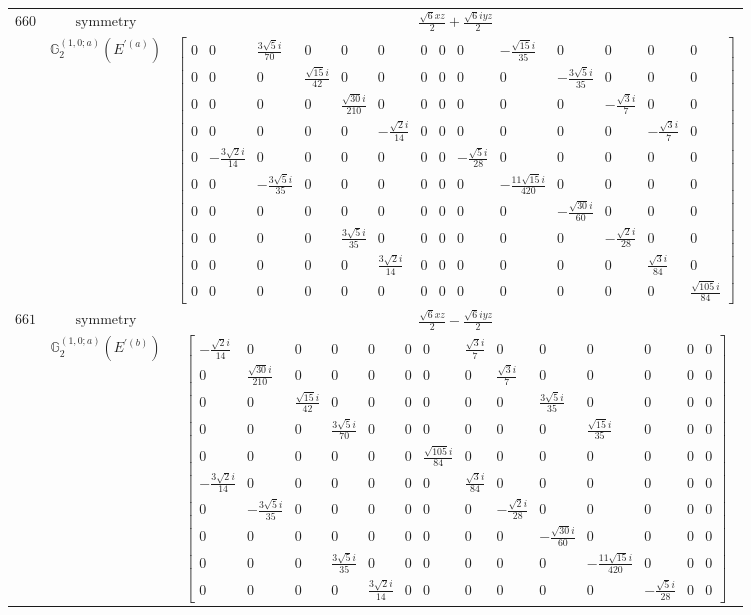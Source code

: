 \documentclass[fleqn,8pt,landscape]{jsarticle}
\begin{document}
\begin{longtable}{ccc}
$ 660 $ & $ \text{symmetry} $ & $ \frac{\sqrt{6} x z}{2} + \frac{\sqrt{6} i y z}{2} $ \\
$  $ & $ \mathbb{G}_{2}^{(1,0;a)}(E^{\prime(a)}) $ & $ \begin{bmatrix} 0 & 0 & \frac{3 \sqrt{5} i}{70} & 0 & 0 & 0 & 0 & 0 & 0 & - \frac{\sqrt{15} i}{35} & 0 & 0 & 0 & 0 \\ 0 & 0 & 0 & \frac{\sqrt{15} i}{42} & 0 & 0 & 0 & 0 & 0 & 0 & - \frac{3 \sqrt{5} i}{35} & 0 & 0 & 0 \\ 0 & 0 & 0 & 0 & \frac{\sqrt{30} i}{210} & 0 & 0 & 0 & 0 & 0 & 0 & - \frac{\sqrt{3} i}{7} & 0 & 0 \\ 0 & 0 & 0 & 0 & 0 & - \frac{\sqrt{2} i}{14} & 0 & 0 & 0 & 0 & 0 & 0 & - \frac{\sqrt{3} i}{7} & 0 \\ 0 & - \frac{3 \sqrt{2} i}{14} & 0 & 0 & 0 & 0 & 0 & 0 & - \frac{\sqrt{5} i}{28} & 0 & 0 & 0 & 0 & 0 \\ 0 & 0 & - \frac{3 \sqrt{5} i}{35} & 0 & 0 & 0 & 0 & 0 & 0 & - \frac{11 \sqrt{15} i}{420} & 0 & 0 & 0 & 0 \\ 0 & 0 & 0 & 0 & 0 & 0 & 0 & 0 & 0 & 0 & - \frac{\sqrt{30} i}{60} & 0 & 0 & 0 \\ 0 & 0 & 0 & 0 & \frac{3 \sqrt{5} i}{35} & 0 & 0 & 0 & 0 & 0 & 0 & - \frac{\sqrt{2} i}{28} & 0 & 0 \\ 0 & 0 & 0 & 0 & 0 & \frac{3 \sqrt{2} i}{14} & 0 & 0 & 0 & 0 & 0 & 0 & \frac{\sqrt{3} i}{84} & 0 \\ 0 & 0 & 0 & 0 & 0 & 0 & 0 & 0 & 0 & 0 & 0 & 0 & 0 & \frac{\sqrt{105} i}{84} \end{bmatrix} $ \\ \hline
$ 661 $ & $ \text{symmetry} $ & $ \frac{\sqrt{6} x z}{2} - \frac{\sqrt{6} i y z}{2} $ \\
$  $ & $ \mathbb{G}_{2}^{(1,0;a)}(E^{\prime(b)}) $ & $ \begin{bmatrix} - \frac{\sqrt{2} i}{14} & 0 & 0 & 0 & 0 & 0 & 0 & \frac{\sqrt{3} i}{7} & 0 & 0 & 0 & 0 & 0 & 0 \\ 0 & \frac{\sqrt{30} i}{210} & 0 & 0 & 0 & 0 & 0 & 0 & \frac{\sqrt{3} i}{7} & 0 & 0 & 0 & 0 & 0 \\ 0 & 0 & \frac{\sqrt{15} i}{42} & 0 & 0 & 0 & 0 & 0 & 0 & \frac{3 \sqrt{5} i}{35} & 0 & 0 & 0 & 0 \\ 0 & 0 & 0 & \frac{3 \sqrt{5} i}{70} & 0 & 0 & 0 & 0 & 0 & 0 & \frac{\sqrt{15} i}{35} & 0 & 0 & 0 \\ 0 & 0 & 0 & 0 & 0 & 0 & \frac{\sqrt{105} i}{84} & 0 & 0 & 0 & 0 & 0 & 0 & 0 \\ - \frac{3 \sqrt{2} i}{14} & 0 & 0 & 0 & 0 & 0 & 0 & \frac{\sqrt{3} i}{84} & 0 & 0 & 0 & 0 & 0 & 0 \\ 0 & - \frac{3 \sqrt{5} i}{35} & 0 & 0 & 0 & 0 & 0 & 0 & - \frac{\sqrt{2} i}{28} & 0 & 0 & 0 & 0 & 0 \\ 0 & 0 & 0 & 0 & 0 & 0 & 0 & 0 & 0 & - \frac{\sqrt{30} i}{60} & 0 & 0 & 0 & 0 \\ 0 & 0 & 0 & \frac{3 \sqrt{5} i}{35} & 0 & 0 & 0 & 0 & 0 & 0 & - \frac{11 \sqrt{15} i}{420} & 0 & 0 & 0 \\ 0 & 0 & 0 & 0 & \frac{3 \sqrt{2} i}{14} & 0 & 0 & 0 & 0 & 0 & 0 & - \frac{\sqrt{5} i}{28} & 0 & 0 \end{bmatrix} $ \\ \hline

\end{longtable}
\end{document}

